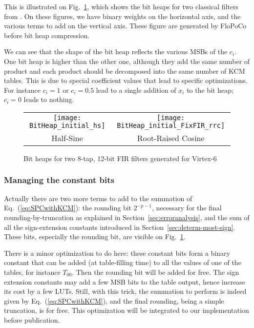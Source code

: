 \documentclass[twocolumn]{IEEEtran}
\begin{document}
This is illustrated on Fig.~\ref{fig:bitheaps}, which shows the bit heaps for two classical filters from \cite{ZigBeeStandard}.
On these figures, we have binary weights on the horizontal axis, and the various terms to add on the vertical axis.
These figure are generated by FloPoCo before bit heap compression.

We can see that the  shape of the bit heap reflects the various MSBs of the $c_i$. 
One bit heap is higher than the other one, although they add the same number of product and each product should be decomposed into the same number of KCM tables.
This is due to special coefficient values that lead to specific optimizations.
For instance $c_i=1$ or $c_i=0.5$ lead to a single addition of $x_i$ to the bit heap; $c_i=0$ leads to nothing.

\begin{figure}
  \begin{center}
    \begin{tabular}{cc}
    \texttt{[image: BitHeap\_initial\_hs]} &
    \texttt{[image: BitHeap\_initial\_FixFIR\_rrc]}\\
    \footnotesize   Half-Sine &\footnotesize Root-Raised Cosine 
\end{tabular}
  \end{center}
  \caption{Bit heaps for two 8-tap, 12-bit FIR filters generated for Virtex-6}
  \label{fig:bitheaps}
\end{figure}

\subsubsection{Managing the constant bits}
Actually there are two more terms to add to the summation of Eq.~(\ref{eq:SPCwithKCM}): the rounding bit $2^{-p-1}$, necessary for the final rounding-by-truncation as explained in Section~\ref{sec:erroranalysis}, and the sum of all the sign-extension constants introduced in Section~\ref{sec:determ-most-sign}. These bits, especially the rounding bit, are visible on  Fig.~\ref{fig:bitheaps}.

There is a minor optimization to do here: these constant bits form a binary constant that can be added (at table-filling time) to all the values of one of the tables, for instance $T_{00}$.
Then the rounding bit will be added for free. 
The sign extension constants may add a few MSB bits to the table output, hence increase its cost by a few LUTs.
Still, with this trick, the summation to perform is  indeed given by Eq.~(\ref{eq:SPCwithKCM}), and the final rounding, being a simple truncation, is for free.
This optimization will be integrated to our implementation before publication.
\end{document}
